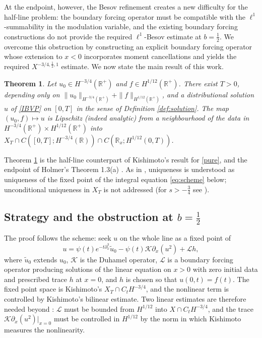 \documentclass[10pt,reqno]{amsart}
\newtheorem{theorem}{Theorem}[section]
\theoremstyle{remark}
\numberwithin{equation}{section}
\newcommand{\R}{\mathbb R}
\newcommand{\pd}{\partial}
\newcommand{\Lc}{\mathcal{L}}
\newcommand{\Kc}{\mathcal{K}}
\begin{document}
At the endpoint, however, the Besov refinement creates a new difficulty for the half-line problem: the boundary forcing operator must be compatible with the $\ell^1$-summability in the modulation variable, and the existing boundary forcing constructions do not provide the required $\ell^1$-Besov estimate at $b=\frac12$. We overcome this obstruction by constructing an explicit boundary forcing operator whose extension to $x<0$ incorporates moment cancellations and yields the required $X^{-3/4,\frac12,1}$ estimate. We now state the main result of this work.

\begin{theorem}\label{thm:main}
Let $u_0\in H^{-3/4}(\R^+)$ and $f\in H^{1/12}(\R^+)$. There exist $T>0$, depending only on $\|u_0\|_{H^{-3/4}(\R^+)}+\|f\|_{H^{1/12}(\R^+)}$, and a distributional solution $u$ of \eqref{IBVP} on $[0,T]$ in the sense of Definition \ref{def:solution}. The map $(u_0,f)\mapsto u$ is Lipschitz (indeed analytic) from a neighbourhood of the data in $H^{-3/4}(\R^+)\times H^{1/12}(\R^+)$ into $X_T\cap C([0,T];H^{-3/4}(\R))\cap C(\R_x;H^{1/12}(0,T))$.
\end{theorem}

Theorem \ref{thm:main} is the half-line counterpart of Kishimoto's result \cite{Kishimoto} for \eqref{pure}, and the endpoint of Holmer's Theorem 1.3(a) \cite{Holmer}. As in \cite{Holmer}, uniqueness is understood as uniqueness of the fixed point of the integral equation \eqref{eq:scheme} below; unconditional uniqueness in $X_T$ is not addressed (for $s>-\frac34$ see \cite{BSZ2}).

\subsection{Strategy and the obstruction at $b=\frac12$}\label{sec:strategy}

The proof follows the scheme: seek $u$ on the whole line as a fixed point of
\begin{equation}\label{eq:scheme}
u=\psi(t)e^{-t\pd_x^3}\tilde u_0-\psi(t)\Kc\pd_x(u^2)+\Lc h,
\end{equation}
where $\tilde u_0$ extends $u_0$, $\Kc$ is the Duhamel operator, $\Lc$ is a boundary forcing operator producing solutions of the linear equation on $x>0$ with zero initial data and prescribed trace $h$ at $x=0$, and $h$ is chosen so that $u(0,t)=f(t)$. The fixed point space is Kishimoto's $X_T\cap C_tH^{-3/4}$, and the nonlinear term is controlled by Kishimoto's bilinear estimate. Two linear estimates are therefore needed beyond \cite{Kishimoto}: $\Lc$ must be bounded from $H^{1/12}$ into $X\cap C_tH^{-3/4}$, and the trace $\Kc\pd_x(u^2)|_{x=0}$ must be controlled in $H^{1/12}$ by the norm in which Kishimoto measures the nonlinearity.
\end{document}
